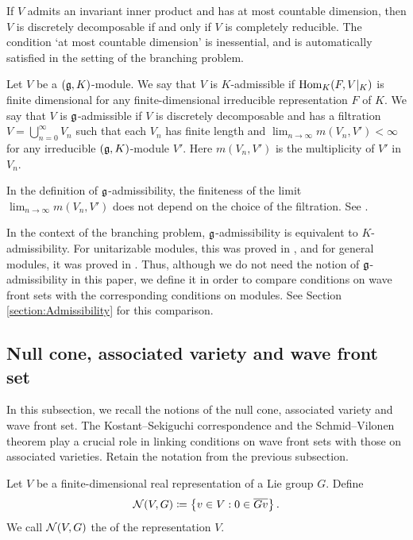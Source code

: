 If $V$ admits an invariant inner product and has at most countable dimension, then $V$ is discretely decomposable if and only if $V$ is completely reducible.
The condition `at most countable dimension' is inessential, and is automatically satisfied in the setting of the branching problem.

\begin{definition} \label{def:Admissible}
	Let $V$ be a $(\mathfrak{g}, K)$-module.
	We say that $V$ is $K$-admissible if $\mathrm{Hom}_{K}(F, V|_{K})$ is finite dimensional for any finite-dimensional irreducible representation $F$ of $K$.
	We say that $V$ is $\mathfrak{g}$-admissible if $V$ is discretely decomposable and has a filtration $V = \bigcup_{n=0}^\infty V_n$ such that each $V_n$ has finite length and $\lim_{n\to \infty} m(V_n, V') < \infty$ for any irreducible $(\mathfrak{g}, K)$-module $V'$.
	Here $m(V_n, V')$ is the multiplicity of $V'$ in $V_n$.
\end{definition}

\begin{remark}
	In the definition of $\mathfrak{g}$-admissibility, the finiteness of the limit $\lim_{n\to \infty} m(V_n, V')$ does not depend on the choice of the filtration.
	See \cite[Definition 3.2]{Os25}.
\end{remark}

In the context of the branching problem, $\mathfrak{g}$-admissibility is equivalent to $K$-admissibility.
For unitarizable modules, this was proved in \cite{ZhLi10}, and for general modules, it was proved in \cite[Theorem 10]{Ki24}.
Thus, although we do not need the notion of $\mathfrak{g}$-admissibility in this paper, we define it in order to compare conditions on wave front sets with the corresponding conditions on modules.
See Section \ref{section:Admissibility} for this comparison.

\subsection{Null cone, associated variety and wave front set}

In this subsection, we recall the notions of the null cone, associated variety and wave front set.
The Kostant--Sekiguchi correspondence and the Schmid--Vilonen theorem play a crucial role in linking conditions on wave front sets with those on associated varieties.
Retain the notation from the previous subsection.

\begin{definition}
	Let $V$ be a finite-dimensional real representation of a Lie group $G$.
	Define
	\begin{align*}
		\mathcal{N}(V, G) \coloneq \left\{v \in V: 0 \in \overline{Gv} \right\}.
	\end{align*}
	We call $\mathcal{N}(V, G)$ the  of the representation $V$.
\end{definition}

